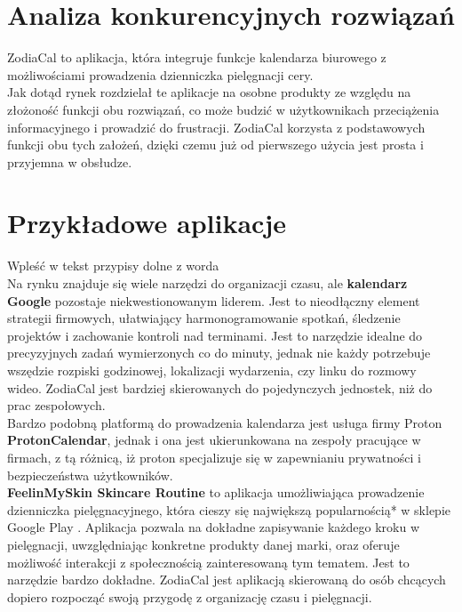 \section{Analiza konkurencyjnych rozwiązań}

\phantom{Th} 
ZodiaCal to aplikacja, która integruje funkcje kalendarza biurowego z możliwościami prowadzenia dzienniczka pielęgnacji cery. \\

Jak dotąd rynek rozdzielał te aplikacje na osobne produkty ze względu na złożoność funkcji obu rozwiązań, co może budzić w użytkownikach przeciążenia informacyjnego  i prowadzić do frustracji. ZodiaCal korzysta z podstawowych funkcji obu tych założeń, dzięki czemu już od pierwszego użycia jest prosta i przyjemna w obsłudze. 

\section{Przykładowe aplikacje}
Wpleść w tekst przypisy dolne z worda\\

\phantom{Th} 
Na rynku znajduje się wiele narzędzi do organizacji czasu, ale \textbf{kalendarz Google} pozostaje niekwestionowanym liderem. Jest to nieodłączny element strategii firmowych, ułatwiający harmonogramowanie spotkań, śledzenie projektów i zachowanie kontroli nad terminami. Jest to narzędzie idealne do precyzyjnych zadań wymierzonych co do minuty, jednak nie każdy potrzebuje wszędzie rozpiski godzinowej, lokalizacji wydarzenia, czy linku do rozmowy wideo. ZodiaCal jest bardziej skierowanych do pojedynczych jednostek, niż do prac zespołowych.\\

Bardzo podobną platformą do prowadzenia kalendarza jest usługa firmy Proton \textbf{ProtonCalendar}, jednak i ona jest ukierunkowana na zespoły pracujące w firmach, z tą różnicą, iż proton specjalizuje się w zapewnianiu prywatności i bezpieczeństwa użytkowników.\\

\textbf{FeelinMySkin Skincare Routine} to aplikacja umożliwiająca prowadzenie dzienniczka pielęgnacyjnego, która cieszy się największą popularnością* w sklepie Google Play . Aplikacja pozwala na dokładne zapisywanie każdego kroku w pielęgnacji, uwzględniając konkretne produkty danej marki, oraz oferuje możliwość interakcji z społecznością zainteresowaną tym tematem. Jest to narzędzie bardzo dokładne. ZodiaCal jest aplikacją skierowaną do osób chcących dopiero rozpocząć swoją przygodę z organizację czasu i pielęgnacji. 

